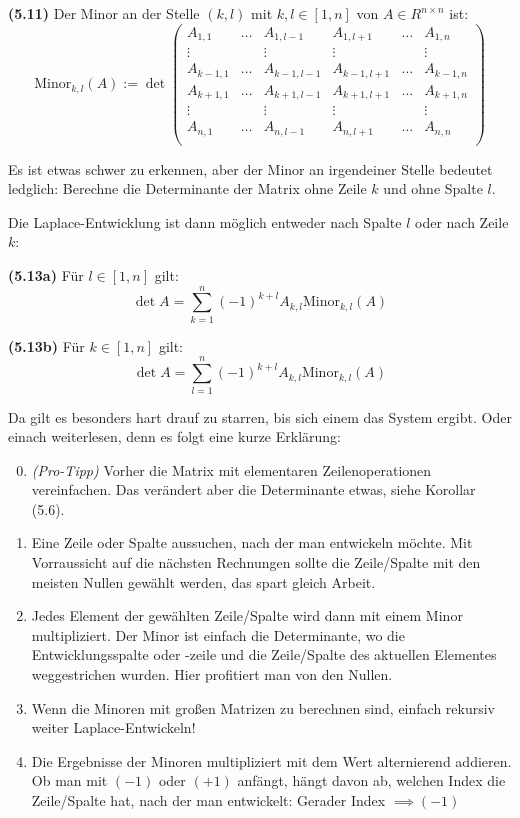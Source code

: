 \documentclass[11pt]{scrartcl}
\newlength{\hangwidth}
\newcommand{\skript}[1]{\settowidth{\hangwidth}{\textbf{(#1)} }\hangpara{\hangwidth}{1}\textbf{(#1)} }
\begin{document}
\skript{5.11} Der Minor an der Stelle $(k,l)$ mit $k,l \in [1,n]$ von $A \in R^{n \times n}$ ist: \\
$$\textrm{Minor}_{k,l}(A) := \det \begin{pmatrix}
A_{1,1} & \ldots & A_{1,l-1} & A_{1,l+1} & \ldots & A_{1,n} \\
\vdots & & \vdots & \vdots & & \vdots \\
A_{k-1,1} & \ldots & A_{k-1,l-1} & A_{k-1,l+1} & \ldots & A_{k-1,n} \\
A_{k+1,1} & \ldots & A_{k+1,l-1} & A_{k+1,l+1} & \ldots & A_{k+1,n} \\
\vdots & & \vdots & \vdots & & \vdots \\
A_{n,1} & \ldots & A_{n,l-1} & A_{n,l+1} & \ldots & A_{n,n} \\
\end{pmatrix}$$

Es ist etwas schwer zu erkennen, aber der Minor an irgendeiner Stelle bedeutet ledglich: Berechne die Determinante der Matrix ohne Zeile $k$ und ohne Spalte $l$.

Die Laplace-Entwicklung ist dann möglich entweder nach Spalte $l$ oder nach Zeile $k$:

\skript{5.13a} Für $l \in [1,n]$ gilt: \\
$$\det A = \sum_{k=1}^n (-1)^{k+l} A_{k,l} \textrm{Minor}_{k,l}(A)$$

\skript{5.13b} Für $k \in [1,n]$ gilt: \\
$$\det A = \sum_{l=1}^n (-1)^{k+l} A_{k,l} \textrm{Minor}_{k,l}(A)$$

Da gilt es besonders hart drauf zu starren, bis sich einem das System ergibt. Oder einach weiterlesen, denn es folgt eine kurze Erklärung:

\begin{enumerate}
\setcounter{enumi}{-1}
\item \textit{(Pro-Tipp)} Vorher die Matrix mit elementaren Zeilenoperationen vereinfachen. Das verändert aber die Determinante etwas, siehe Korollar (5.6).
\item Eine Zeile oder Spalte aussuchen, nach der man entwickeln möchte. Mit Vorraussicht auf die nächsten Rechnungen sollte die Zeile/Spalte mit den meisten Nullen gewählt werden, das spart gleich Arbeit.
\item Jedes Element der gewählten Zeile/Spalte wird dann mit einem Minor multipliziert. Der Minor ist einfach die Determinante, wo die Entwicklungsspalte oder -zeile und die Zeile/Spalte des aktuellen Elementes weggestrichen wurden. Hier profitiert man von den Nullen.
\item Wenn die Minoren mit großen Matrizen zu berechnen sind, einfach rekursiv weiter Laplace-Entwickeln!
\item Die Ergebnisse der Minoren multipliziert mit dem Wert alternierend addieren. Ob man mit $(-1)$ oder $(+1)$ anfängt, hängt davon ab, welchen Index die Zeile/Spalte hat, nach der man entwickelt: Gerader Index $\implies (-1)$
\end{enumerate}
\end{document}
